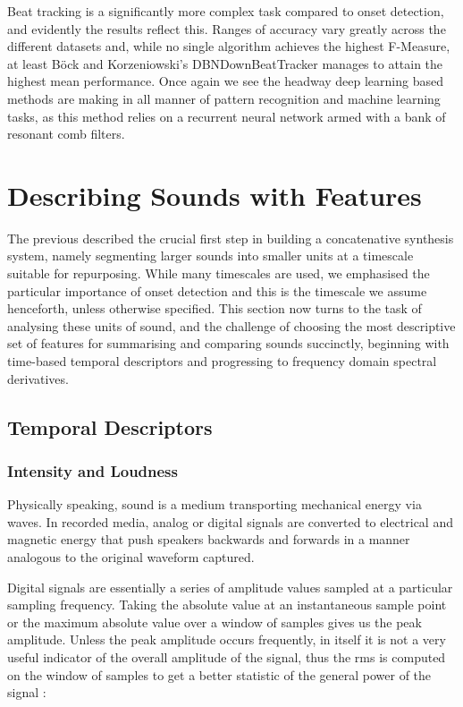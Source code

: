 {{Beat tracking is a significantly more complex task compared to onset detection, and evidently the results reflect this. Ranges of accuracy vary greatly across the different datasets and, while no single algorithm achieves the highest F-Measure, at least Böck and Korzeniowski’s DBNDownBeatTracker manages to attain the highest mean performance. Once again we see the headway deep learning based methods are making in all manner of pattern recognition and machine learning tasks, as this method relies on a recurrent neural network armed with a bank of resonant comb filters. 

\section{Describing Sounds with Features}

The previous  described the crucial first step in building a concatenative synthesis system, namely segmenting larger sounds into smaller units at a timescale suitable for repurposing. While many timescales are used, we emphasised the particular importance of onset detection and this is the timescale we assume henceforth, unless otherwise specified. This section now turns to the task of analysing these units of sound, and the challenge of choosing the most descriptive set of features for summarising and comparing sounds succinctly, beginning with time-based temporal descriptors and progressing to frequency domain spectral derivatives.

\subsection{Temporal Descriptors}

\subsubsection{Intensity and Loudness}

Physically speaking, sound is a medium transporting mechanical energy via waves. In recorded media, analog or digital signals are converted to electrical and magnetic energy that push speakers backwards and forwards in a manner analogous to the original waveform captured.

Digital signals are essentially a series of amplitude values sampled at a particular sampling frequency. Taking the absolute value at an instantaneous sample point or the maximum absolute value over a window of samples gives us the peak amplitude. Unless the peak amplitude occurs frequently, in itself it is not a very useful indicator of the overall amplitude of the signal, thus the \acrfull{rms} is computed on the window of samples to get a better statistic of the general power of the signal \citep{Puckette2006}:

}}
